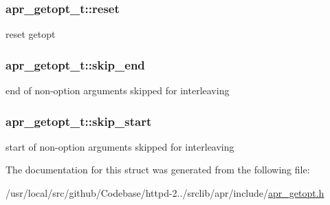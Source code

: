 \subsubsection[{\texorpdfstring{reset}{reset}}]{ apr\+\_\+getopt\+\_\+t\+::reset}\hypertarget{structapr__getopt__t_abc4e72bc761666c0b0d9015c3b0de8c3}{}\label{structapr__getopt__t_abc4e72bc761666c0b0d9015c3b0de8c3}
reset getopt 
\subsubsection[{\texorpdfstring{skip\+\_\+end}{skip_end}}]{ apr\+\_\+getopt\+\_\+t\+::skip\+\_\+end}\hypertarget{structapr__getopt__t_ae9e7e6eb1576820c7dc6e589cc3a28b7}{}\label{structapr__getopt__t_ae9e7e6eb1576820c7dc6e589cc3a28b7}
end of non-\/option arguments skipped for interleaving 
\subsubsection[{\texorpdfstring{skip\+\_\+start}{skip_start}}]{ apr\+\_\+getopt\+\_\+t\+::skip\+\_\+start}\hypertarget{structapr__getopt__t_a0cd41eedf9ed82bf5d9dcc3491ee67dd}{}\label{structapr__getopt__t_a0cd41eedf9ed82bf5d9dcc3491ee67dd}
start of non-\/option arguments skipped for interleaving 

The documentation for this struct was generated from the following file\+:\begin{DoxyCompactItemize}
\item 
/usr/local/src/github/\+Codebase/httpd-\/2../srclib/apr/include/\hyperlink{apr__getopt_8h}{apr\+\_\+getopt.\+h}\end{DoxyCompactItemize}
